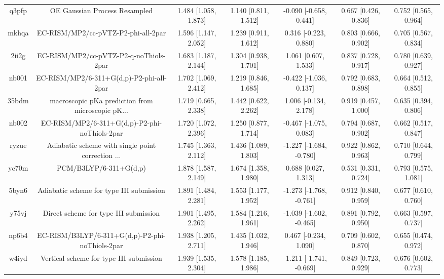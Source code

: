 \documentclass{article}
\begin{document}
\begin{center}
\begin{longtable}{|ccccccc|}
 q3pfp &                      OE Gaussian Process Resampled &  1.484 [1.058, 1.873] &  1.140 [0.811, 1.512] &   -0.090 [-0.658, 0.441] &  0.667 [0.426, 0.836] &   0.752 [0.565, 0.964] \\
 mkhqa &                EC-RISM/MP2/cc-pVTZ-P2-phi-all-2par &  1.596 [1.147, 2.052] &  1.239 [0.911, 1.612] &    0.316 [-0.223, 0.880] &  0.803 [0.666, 0.902] &   0.705 [0.567, 0.834] \\
 2ii2g &             EC-RISM/MP2/cc-pVTZ-P2-q-noThiols-2par &  1.683 [1.187, 2.144] &  1.304 [0.938, 1.701] &     1.061 [0.607, 1.533] &  0.837 [0.728, 0.917] &   0.780 [0.639, 0.927] \\
 nb001 &           EC-RISM/MP2/6-311+G(d,p)-P2-phi-all-2par &  1.702 [1.069, 2.412] &  1.219 [0.846, 1.685] &   -0.422 [-1.036, 0.137] &  0.792 [0.683, 0.898] &   0.664 [0.512, 0.855] \\
 35bdm &  macroscopic pKa prediction from microscopic pK... &  1.719 [0.665, 2.338] &  1.442 [0.622, 2.262] &    1.006 [-0.134, 2.178] &  0.919 [0.457, 1.000] &   0.635 [0.394, 0.806] \\
 nb002 &      EC-RISM/MP2/6-311+G(d,p)-P2-phi-noThiols-2par &  1.720 [1.072, 2.396] &  1.250 [0.877, 1.714] &   -0.467 [-1.075, 0.083] &  0.794 [0.687, 0.902] &   0.662 [0.517, 0.847] \\
 ryzue &  Adiabatic scheme with single point correction ... &  1.745 [1.363, 2.112] &  1.436 [1.089, 1.803] &  -1.227 [-1.684, -0.780] &  0.922 [0.862, 0.963] &   0.710 [0.644, 0.799] \\
 yc70m &                             PCM/B3LYP/6-311+G(d,p) &  1.878 [1.587, 2.149] &  1.674 [1.358, 1.980] &     0.688 [0.027, 1.313] &  0.531 [0.331, 0.724] &   0.793 [0.575, 1.081] \\
 5byn6 &           Adiabatic scheme for type III submission &  1.891 [1.484, 2.281] &  1.553 [1.177, 1.952] &  -1.273 [-1.768, -0.761] &  0.912 [0.840, 0.959] &   0.677 [0.610, 0.760] \\
 y75vj &              Direct scheme for type III submission &  1.901 [1.495, 2.262] &  1.584 [1.216, 1.961] &  -1.039 [-1.602, -0.465] &  0.891 [0.792, 0.950] &   0.663 [0.597, 0.737] \\
 np6b4 &    EC-RISM/B3LYP/6-311+G(d,p)-P2-phi-noThiols-2par &  1.938 [1.205, 2.711] &  1.435 [1.032, 1.946] &    0.467 [-0.234, 1.090] &  0.709 [0.602, 0.870] &   0.655 [0.474, 0.972] \\
 w4iyd &            Vertical scheme for type III submission &  1.939 [1.535, 2.304] &  1.578 [1.185, 1.986] &  -1.211 [-1.741, -0.669] &  0.849 [0.723, 0.929] &   0.676 [0.602, 0.773] \\

\end{longtable}
\end{center}
\end{document}
